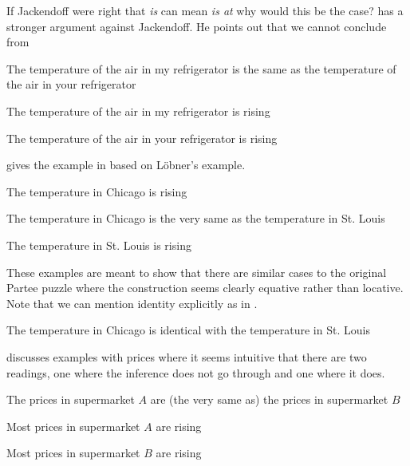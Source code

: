 If Jackendoff were right that \textit{is} can mean \textit{is at} why
would this be the case?  \cite{Lobner1981} has a stronger argument
against Jackendoff.  He points out that we cannot conclude 
from 
\begin{ex} 
\begin{subex} 
 
\item The temperature of the air in my refrigerator is the same as the
  temperature of the air in your refrigerator

 
\item The temperature of the air in my refrigerator is rising

\item The temperature of the air in your refrigerator is rising  
 
\end{subex} 
   
\end{ex} 
\cite{Lasersohn2005a} gives the example in \nexteg{} based on Löbner's
example.
\begin{ex} 
\begin{subex} 
 
\item The temperature in Chicago is rising 
 
\item The temperature in Chicago is the very same as the temperature
  in St. Louis

\item The temperature in St. Louis is rising
 
\end{subex} 
   
\end{ex} 
These examples are meant to show that there are similar cases to the
original Partee puzzle where the construction seems clearly equative
rather than locative.  Note that we can mention identity explicitly as
in \nexteg{}.
\begin{ex} 
The temperature in Chicago is identical with the temperature in St. Louis 
\end{ex} 
\cite{Romero2008} discusses examples with prices where it seems
intuitive that there are two readings, one where the inference does
not go through and one where it does.
\begin{ex} 
\begin{subex} 
 
\item The prices in supermarket $A$ are (the very same as) the prices
  in supermarket $B$ 
 
\item Most prices in supermarket $A$ are rising

\item Most prices in supermarket $B$ are rising 
 
\end{subex} 
   
\end{ex} 
